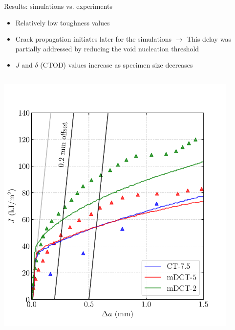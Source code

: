 \documentclass[9pt]{beamer}
\begin{document}

\begin{frame}{Results: simulations vs. experiments}

\begin{itemize}
	\item Relatively low toughness values
	\vspace{0.1cm}
    \item Crack propagation initiates later for the simulations $\rightarrow$ This delay was partially addressed by reducing the void nucleation threshold
    \vspace{0.1cm}
    \item $J$ and $\delta$ (CTOD) values increase as specimen size decreases
\end{itemize}

\begin{columns}
    \centering
    \includegraphics[width=0.9\textwidth]{Images/plot_J-da_ALL_X52.pdf}
    

\end{columns}
\end{frame}
\end{document}
